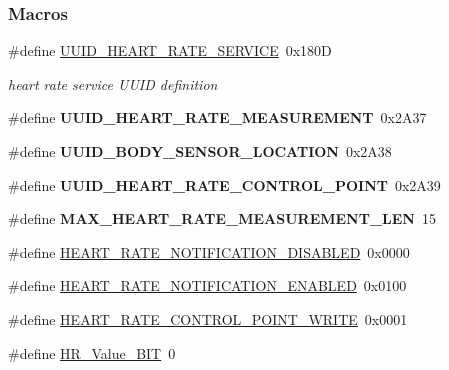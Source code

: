 \subsubsection*{Macros}
\begin{DoxyCompactItemize}
\item 
\#define \hyperlink{group___b_l_e___h_r_s_gaf7984dd018f2a38d50015a19238b0a8f}{U\+U\+I\+D\+\_\+\+H\+E\+A\+R\+T\+\_\+\+R\+A\+T\+E\+\_\+\+S\+E\+R\+V\+I\+CE}~0x180D\hypertarget{group___b_l_e___h_r_s_gaf7984dd018f2a38d50015a19238b0a8f}{}\label{group___b_l_e___h_r_s_gaf7984dd018f2a38d50015a19238b0a8f}

\begin{DoxyCompactList}\small\item\em heart rate service U\+U\+ID definition \end{DoxyCompactList}\item 
\#define {\bfseries U\+U\+I\+D\+\_\+\+H\+E\+A\+R\+T\+\_\+\+R\+A\+T\+E\+\_\+\+M\+E\+A\+S\+U\+R\+E\+M\+E\+NT}~0x2\+A37\hypertarget{group___b_l_e___h_r_s_gaa136cdcaaee49143190cc21b48f281d4}{}\label{group___b_l_e___h_r_s_gaa136cdcaaee49143190cc21b48f281d4}

\item 
\#define {\bfseries U\+U\+I\+D\+\_\+\+B\+O\+D\+Y\+\_\+\+S\+E\+N\+S\+O\+R\+\_\+\+L\+O\+C\+A\+T\+I\+ON}~0x2\+A38\hypertarget{group___b_l_e___h_r_s_gaa9c7f663c695357cb0e8eef5e7d088a0}{}\label{group___b_l_e___h_r_s_gaa9c7f663c695357cb0e8eef5e7d088a0}

\item 
\#define {\bfseries U\+U\+I\+D\+\_\+\+H\+E\+A\+R\+T\+\_\+\+R\+A\+T\+E\+\_\+\+C\+O\+N\+T\+R\+O\+L\+\_\+\+P\+O\+I\+NT}~0x2\+A39\hypertarget{group___b_l_e___h_r_s_ga82054fce592def41b0c2ef718db806c5}{}\label{group___b_l_e___h_r_s_ga82054fce592def41b0c2ef718db806c5}

\item 
\#define {\bfseries M\+A\+X\+\_\+\+H\+E\+A\+R\+T\+\_\+\+R\+A\+T\+E\+\_\+\+M\+E\+A\+S\+U\+R\+E\+M\+E\+N\+T\+\_\+\+L\+EN}~15\hypertarget{group___b_l_e___h_r_s_gad2714a3f04ec678778fd2dd1ab2d7354}{}\label{group___b_l_e___h_r_s_gad2714a3f04ec678778fd2dd1ab2d7354}

\item 
\#define \hyperlink{group___b_l_e___h_r_s_ga5a46058550c3b3cf1e042f16f9c8c64e}{H\+E\+A\+R\+T\+\_\+\+R\+A\+T\+E\+\_\+\+N\+O\+T\+I\+F\+I\+C\+A\+T\+I\+O\+N\+\_\+\+D\+I\+S\+A\+B\+L\+ED}~0x0000
\item 
\#define \hyperlink{group___b_l_e___h_r_s_ga06378ba9251b48422062ef7b31db7d42}{H\+E\+A\+R\+T\+\_\+\+R\+A\+T\+E\+\_\+\+N\+O\+T\+I\+F\+I\+C\+A\+T\+I\+O\+N\+\_\+\+E\+N\+A\+B\+L\+ED}~0x0100
\item 
\#define \hyperlink{group___b_l_e___h_r_s_ga4ce40f9452d970df97e8b54e173ed9f2}{H\+E\+A\+R\+T\+\_\+\+R\+A\+T\+E\+\_\+\+C\+O\+N\+T\+R\+O\+L\+\_\+\+P\+O\+I\+N\+T\+\_\+\+W\+R\+I\+TE}~0x0001
\item 
\#define \hyperlink{group___b_l_e___h_r_s_ga315a74df2a429c72d429ed43dee0f9be}{H\+R\+\_\+\+Value\+\_\+B\+IT}~0\hypertarget{group___b_l_e___h_r_s_ga315a74df2a429c72d429ed43dee0f9be}{}\label{group___b_l_e___h_r_s_ga315a74df2a429c72d429ed43dee0f9be}


\end{DoxyCompactItemize}
